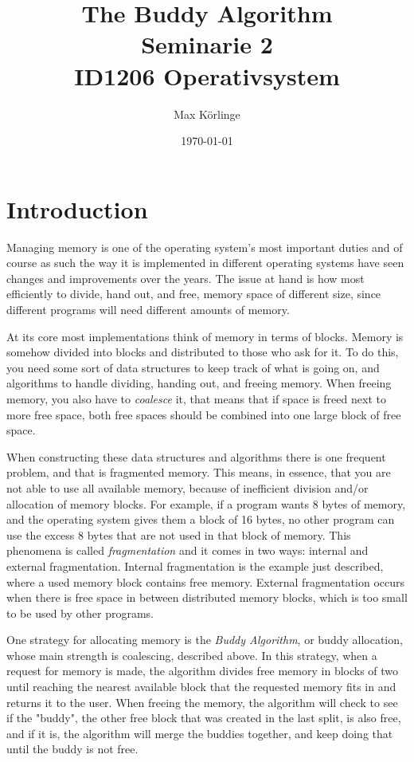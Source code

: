 \documentclass{article}
\begin{document}
\title{The Buddy Algorithm \\
\medskip
\large Seminarie 2 \\ 
\medskip
ID1206 Operativsystem }
\author{Max Körlinge}
\date{\today}
\maketitle


\section{Introduction}

Managing memory is one of the operating system's most important duties and of course as such the way it is implemented in different operating systems have seen changes and improvements over the years. The issue at hand is how most efficiently to divide, hand out, and free, memory space of different size, since different programs will need different amounts of memory.

At its core most implementations think of memory in terms of blocks. Memory is somehow divided into blocks and distributed to those who ask for it. To do this, you need some sort of data structures to keep track of what is going on, and algorithms to handle dividing, handing out, and freeing memory. When freeing memory, you also have to \textit{coalesce} it, that means that if space is freed next to more free space, both free spaces should be combined into one large block of free space.

When constructing these data structures and algorithms there is one frequent problem, and that is fragmented memory. This means, in essence, that you are not able to use all available memory, because of inefficient division and/or allocation of memory blocks. For example, if a program wants 8 bytes of memory, and the operating system gives them a block of 16 bytes, no other program can use the excess 8 bytes that are not used in that block of memory. This phenomena is called \textit{fragmentation} and it comes in two ways: internal and external fragmentation. Internal fragmentation is the example just described, where a used memory block contains free memory. External fragmentation occurs when there is free space in between distributed memory blocks, which is too small to be used by other programs.

One strategy for allocating memory is the \textit{Buddy Algorithm}, or buddy allocation, whose main strength is coalescing, described above. In this strategy, when a request for memory is made, the algorithm divides free memory in blocks of two until reaching the nearest available block that the requested memory fits in and returns it to the user. When freeing the memory, the algorithm will check to see if the "buddy", the other free block that was created in the last split, is also free, and if it is, the algorithm will merge the buddies together, and keep doing that until the buddy is not free.
\end{document}
